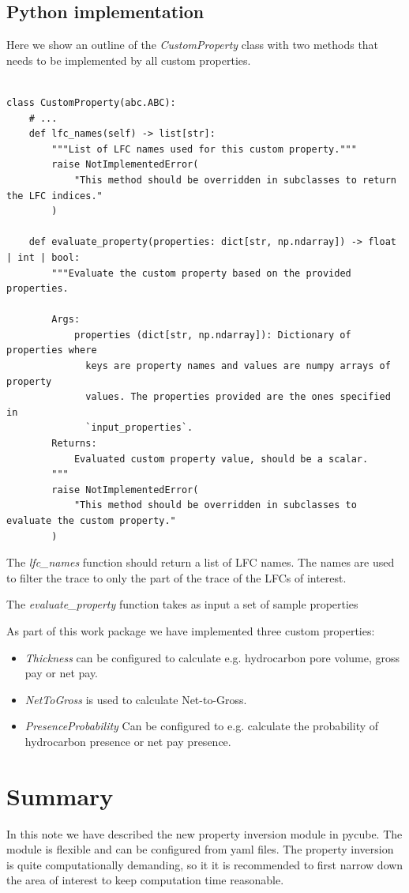 \documentclass[note,screen,english,12pt,utf8]{nrdoc}
\begin{document}
\subsection{Python implementation}

Here we show an outline of the \emph{CustomProperty} class with two methods
that needs to be implemented by all custom properties.

\begin{verbatim}

class CustomProperty(abc.ABC):
    # ...
    def lfc_names(self) -> list[str]:
        """List of LFC names used for this custom property."""
        raise NotImplementedError(
            "This method should be overridden in subclasses to return the LFC indices."
        )

    def evaluate_property(properties: dict[str, np.ndarray]) -> float | int | bool:
        """Evaluate the custom property based on the provided properties.

        Args:
            properties (dict[str, np.ndarray]): Dictionary of properties where
              keys are property names and values are numpy arrays of property
              values. The properties provided are the ones specified in
              `input_properties`.
        Returns:
            Evaluated custom property value, should be a scalar.
        """
        raise NotImplementedError(
            "This method should be overridden in subclasses to evaluate the custom property."
        )
\end{verbatim}

The \emph{lfc\_names} function should return a list of LFC names. The
names are used to filter the trace to only the part of the
trace of the LFCs of interest.

The \emph{evaluate\_property} function takes as input a set of sample properties

As part of this work package we have implemented three custom properties:
\begin{itemize}
    \item \emph{Thickness} can be configured to calculate e.g. hydrocarbon pore volume, gross pay or net pay.
    \item \emph{NetToGross} is used to calculate Net-to-Gross.
    \item \emph{PresenceProbability} Can be configured to e.g. calculate the probability of hydrocarbon presence or net pay presence.
\end{itemize}


\section{Summary}
In this note we have described the new property inversion module in pycube.
The module is flexible and can be configured from yaml files. The property
inversion is quite computationally demanding, so it it is recommended to
first narrow down the area of interest to keep computation time reasonable.
\end{document}
